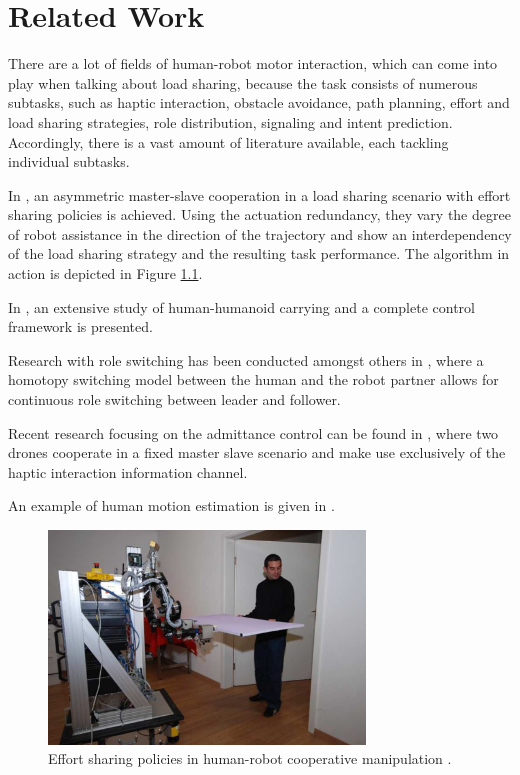 \chapter{Related Work}
There are a lot of fields of human-robot motor interaction, which can come into play when talking about load sharing, because the task consists of numerous subtasks, such as haptic interaction, obstacle avoidance, path planning, effort and load sharing strategies, role distribution, signaling and intent prediction. Accordingly, there is a vast amount of literature available, each tackling individual subtasks.

In \citep{lawitzky2010load}, an asymmetric master-slave cooperation in a load sharing scenario with effort sharing policies is achieved. Using the actuation redundancy, they vary the degree of robot assistance in the direction of the trajectory and show an interdependency of the load sharing strategy and the resulting task performance. The algorithm in action is depicted in Figure \ref{pics:lawitzky2010}.

In \citep{agravante2016human}, an extensive study of human-humanoid carrying and a complete control framework is presented.

Research with role switching has been conducted amongst others in  \citep{evrard2009homotopy}, where a homotopy switching model between the human and the robot partner allows for continuous role switching between leader and follower.

Recent research focusing on the admittance control can be found in \citep{tagliabue2017collaborative}, where two drones cooperate in a fixed master slave scenario and make use exclusively of the haptic interaction information channel.

An example of human motion estimation is given in \citep{thobbi2011using}.


\begin{figure}[h]
   \centering
   \includegraphics[width=0.75\textwidth]{images/lawitzky2010.png}
   \caption{Effort sharing policies in human-robot cooperative manipulation  \citep{lawitzky2010load}.}
   \label{pics:lawitzky2010}
\end{figure}

